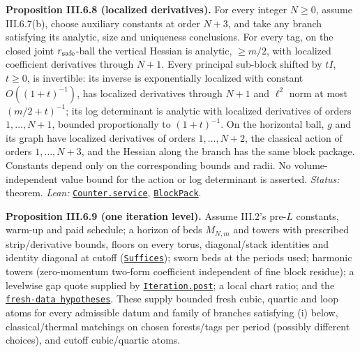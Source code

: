 \documentclass[
  letterpaper,
  11pt]{article}
\begin{document}
\textbf{Proposition III.6.8 (localized derivatives).} For every integer
\(N\ge0\), assume III.6.7(b), choose auxiliary constants at order
\(N+3\), and take any branch satisfying its analytic, size and
uniqueness conclusions. For every tag, on the closed joint
\(r_{\rm safe}\)-ball the vertical Hessian is analytic, \(\ge m/2\),
with localized coefficient derivatives through \(N+1\). Every principal
sub-block shifted by \(tI\), \(t\ge0\), is invertible: its inverse is
exponentially localized with constant \(O((1+t)^{-1})\), has localized
derivatives through \(N+1\) and \(\ell^2\) norm at most
\((m/2+t)^{-1}\); its log determinant is analytic with localized
derivatives of orders \(1,\ldots,N+1\), bounded proportionally to
\((1+t)^{-1}\). On the horizontal ball, \(g\) and its graph have
localized derivatives of orders \(1,\ldots,N+2\), the classical action
of orders \(1,\ldots,N+3\), and the Hessian along the branch has the
same block package. Constants depend only on the corresponding bounds
and radii. No volume-independent value bound for the action or log
determinant is asserted. \emph{Status:} theorem. \emph{Lean:}
\href{https://github.com/yang-mills-group/OpenAI-YM-20261028/blob/3456e5e75cf8d4cd558955a5c7638fba2d68f464/YM/Planned/STATIONARY_JET_PORT/InUse.lean\#L116-L145}{\texttt{Counter.service}},
\href{https://github.com/yang-mills-group/OpenAI-YM-20261028/blob/3456e5e75cf8d4cd558955a5c7638fba2d68f464/YM/Planned/STATIONARY_JET_PORT/Pack.lean\#L65-L84}{\texttt{BlockPack}}.

\textbf{Proposition III.6.9 (one iteration level).} Assume III.2's
pre-\(L\) constants, warm-up and paid schedule; a horizon of beds
\(M_{N,m}\) and towers with prescribed strip/derivative bounds, floors
on every torus, diagonal/stack identities and identity diagonal at
cutoff
(\href{https://github.com/yang-mills-group/OpenAI-YM-20261028/blob/3456e5e75cf8d4cd558955a5c7638fba2d68f464/YM/PREC/Stacks.lean\#L132-L139}{\texttt{Suffices}});
sworn beds at the periods used; harmonic towers (zero-momentum two-form
coefficient independent of fine block residue); a levelwise gap quote
supplied by
\href{https://github.com/yang-mills-group/OpenAI-YM-20261028/blob/3456e5e75cf8d4cd558955a5c7638fba2d68f464/YM/Extra/ITERATION_NO_LOSS/Post.lean\#L99-L106}{\texttt{Iteration.post}};
a local chart ratio; and the
\href{https://github.com/yang-mills-group/OpenAI-YM-20261028/blob/3456e5e75cf8d4cd558955a5c7638fba2d68f464/YM/Extra/ITERATION_NO_LOSS/Gates.lean\#L79-L96}{\texttt{fresh-data\ hypotheses}}.
These supply bounded fresh cubic, quartic and loop atoms for every
admissible datum and family of branches satisfying (i) below,
classical/thermal matchings on chosen forests/tags per period (possibly
different choices), and cutoff cubic/quartic atoms.
\end{document}
